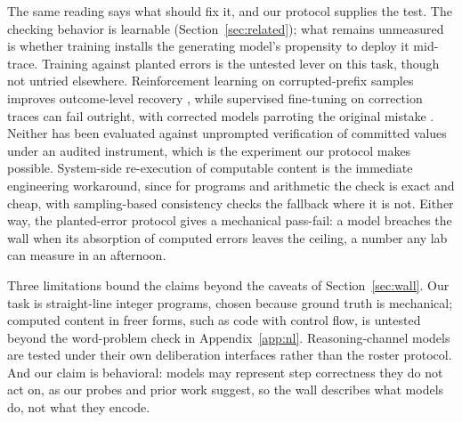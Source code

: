 The same reading says what should fix it, and our protocol supplies the test. The checking behavior is learnable (Section~\ref{sec:related}); what remains unmeasured is whether training installs the generating model's propensity to deploy it mid-trace. Training against planted errors is the untested lever on this task, though not untried elsewhere. Reinforcement learning on corrupted-prefix samples improves outcome-level recovery \citep{rlflawed2025}, while supervised fine-tuning on correction traces can fail outright, with corrected models parroting the original mistake \citep{sfterr2025}. Neither has been evaluated against unprompted verification of committed values under an audited instrument, which is the experiment our protocol makes possible. System-side re-execution of computable content is the immediate engineering workaround, since for programs and arithmetic the check is exact and cheap, with sampling-based consistency checks \citep{wang2023selfconsistency,manakul2023selfcheckgpt} the fallback where it is not. Either way, the planted-error protocol gives a mechanical pass-fail: a model breaches the wall when its absorption of computed errors leaves the ceiling, a number any lab can measure in an afternoon.

Three limitations bound the claims beyond the caveats of Section~\ref{sec:wall}. Our task is straight-line integer programs, chosen because ground truth is mechanical; computed content in freer forms, such as code with control flow, is untested beyond the word-problem check in Appendix~\ref{app:nl}. Reasoning-channel models are tested under their own deliberation interfaces rather than the roster protocol. And our claim is behavioral: models may represent step correctness they do not act on, as our probes and prior work suggest, so the wall describes what models do, not what they encode.
